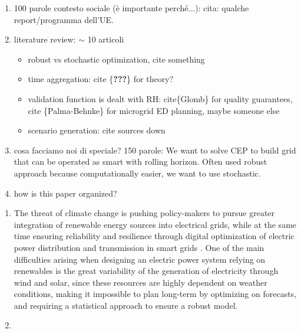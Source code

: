 \begin{enumerate}
  \item 100 parole contesto sociale (è importante perché...): cita: qualche report/programma dell'UE.
  \item literature review: $\sim$ 10 articoli
  \begin{itemize}
    \item robust vs stochastic optimization, cite something
    \item time aggregation: cite \{\textbf{???}\} for theory?
    \item validation function is dealt with RH: cite\{Glomb\} for quality guarantees, cite \{Palma-Behnke\} for microgrid ED planning, maybe someone else
    \item scenario generation: cite sources down
  \end{itemize} 
  \item cosa facciamo noi di speciale? 150 parole: We want to solve CEP to build grid that can be operated as smart with rolling horizon. Often used robust approach because computationally easier, we want to use stochastic.
  \item how is this paper organized?
\end{enumerate}


\begin{enumerate}
\item The threat of climate change is pushing policy-makers to pursue greater integration of renewable energy sources into electrical grids, while at the same time ensuring reliability and resilience through digital optimization of electric power distribution and transmission in smart grids \cite{EU_context}.
One of the main difficulties arising when designing an electric power system relying on renewables is the great variability of the generation of electricity through wind and solar, since these resources are highly dependent on weather conditions, making it impossible to plan long-term by optimizing on forecasts, and requiring a statistical approach to ensure a robust model.
\item 
\end{enumerate}


